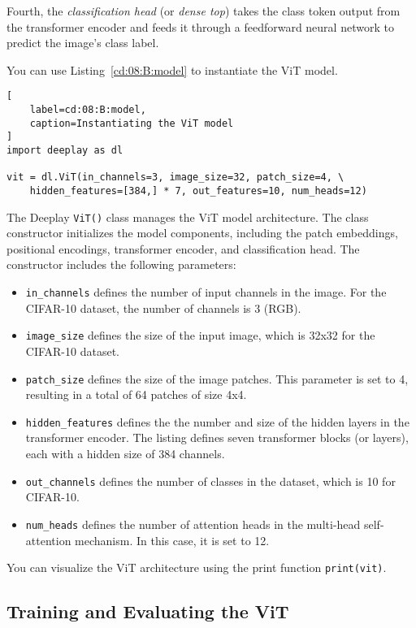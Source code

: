 Fourth, the \emph{classification head} (or \emph{dense top}) takes the class token output from the transformer encoder and feeds it through a feedforward neural network to predict the image's class label.

You can use Listing~\ref{cd:08:B:model} to instantiate the ViT model.
\begin{lstlisting}[
    label=cd:08:B:model,
    caption=Instantiating the ViT model
]
import deeplay as dl

vit = dl.ViT(in_channels=3, image_size=32, patch_size=4, \
    hidden_features=[384,] * 7, out_features=10, num_heads=12)
\end{lstlisting}
The Deeplay \lstinline{ViT()} class manages the ViT model architecture. The class constructor initializes the model components, including the patch embeddings, positional encodings, transformer encoder, and classification head. The constructor includes the following parameters:
\begin{itemize}
    \item \lstinline{in_channels} defines the number of input channels in the image. For the CIFAR-10 dataset, the number of channels is 3 (RGB).
    \item \lstinline{image_size} defines the size of the input image, which is 32x32 for the CIFAR-10 dataset.
    \item \lstinline{patch_size} defines the size of the image patches. This parameter is set to 4, resulting in a total of 64 patches of size 4x4.
    \item \lstinline{hidden_features} defines the the number and size of the hidden layers in the transformer encoder. The listing defines seven transformer blocks (or layers), each with a hidden size of 384 channels.
    \item \lstinline{out_channels} defines the number of classes in the dataset, which is 10 for CIFAR-10.
    \item \lstinline{num_heads}  defines the number of attention heads in the multi-head self-attention mechanism. In this case, it is set to 12.
\end{itemize}

You can visualize the ViT architecture using the print function \lstinline{print(vit)}.

\subsection{Training and Evaluating the ViT}

